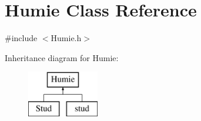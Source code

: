 \hypertarget{class_humie}{}\section{Humie Class Reference}
\label{class_humie}


{\ttfamily \#include $<$Humie.\+h$>$}

Inheritance diagram for Humie\+:\begin{figure}[H]
\begin{center}
\leavevmode
\includegraphics[height=2.000000cm]{df/def/class_humie}
\end{center}
\end{figure}
